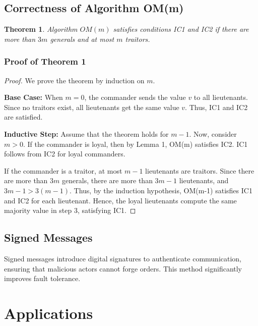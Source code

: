 \documentclass[12pt]{article}
\newtheorem{theorem}{Theorem}
\theoremstyle{remark}
\newtheorem*{proof}{Proof}
\begin{document}
\subsection*{Correctness of Algorithm OM(m)}

\begin{theorem}
  Algorithm \( OM(m) \) satisfies conditions IC1 and IC2 if there are more than \( 3m \) generals and at most \( m \) traitors.   
\end{theorem}


\subsubsection*{Proof of Theorem 1}

\begin{proof}
   We prove the theorem by induction on \( m \).

\textbf{Base Case:} When \( m = 0 \), the commander sends the value \( v \) to all lieutenants. Since no traitors exist, all lieutenants get the same value \( v \). Thus, IC1 and IC2 are satisfied.

\textbf{Inductive Step:} Assume that the theorem holds for \( m-1 \). Now, consider \( m > 0 \). If the commander is loyal, then by Lemma 1, OM(m) satisfies IC2. IC1 follows from IC2 for loyal commanders.

If the commander is a traitor, at most \( m-1 \) lieutenants are traitors. Since there are more than \( 3m \) generals, there are more than \( 3m-1 \) lieutenants, and \( 3m-1 > 3(m-1) \). Thus, by the induction hypothesis, OM(m-1) satisfies IC1 and IC2 for each lieutenant. Hence, the loyal lieutenants compute the same majority value in step 3, satisfying IC1. 
\end{proof}



\subsection*{\textbf{Signed Messages}}
Signed messages introduce digital signatures to authenticate communication, ensuring that malicious actors cannot forge orders. This method significantly improves fault tolerance.

\section*{\centering Applications}
\renewcommand\thesubsection{A.\arabic{subsection}}
\end{document}
